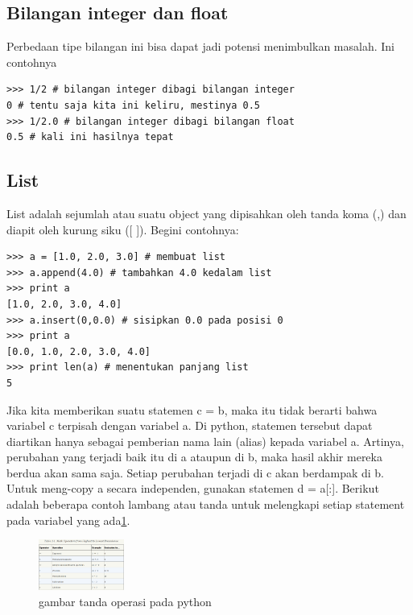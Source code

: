 \subsection{Bilangan integer dan float}
Perbedaan tipe bilangan ini bisa dapat jadi potensi menimbulkan masalah. 
Ini contohnya
\begin{verbatim}
>>> 1/2 # bilangan integer dibagi bilangan integer
0 # tentu saja kita ini keliru, mestinya 0.5
>>> 1/2.0 # bilangan integer dibagi bilangan float
0.5 # kali ini hasilnya tepat
\end{verbatim}

\subsection{List}
List adalah sejumlah atau suatu object yang dipisahkan oleh tanda koma (,) dan diapit oleh kurung siku
([ ]). Begini contohnya:
\begin{verbatim}
>>> a = [1.0, 2.0, 3.0] # membuat list
>>> a.append(4.0) # tambahkan 4.0 kedalam list
>>> print a
[1.0, 2.0, 3.0, 4.0]
>>> a.insert(0,0.0) # sisipkan 0.0 pada posisi 0
>>> print a
[0.0, 1.0, 2.0, 3.0, 4.0]
>>> print len(a) # menentukan panjang list
5
\end{verbatim}
Jika kita memberikan suatu statemen c = b, maka itu tidak berarti bahwa variabel c terpisah dengan
variabel a. Di python, statemen tersebut dapat diartikan hanya sebagai pemberian nama lain
(alias) kepada variabel a. Artinya, perubahan yang terjadi baik itu di a ataupun di b, maka hasil
akhir mereka berdua akan sama saja. Setiap perubahan terjadi di c akan berdampak di b.
Untuk meng-copy a secara independen, gunakan statemen d = a[:]. 
Berikut adalah beberapa contoh lambang atau tanda untuk melengkapi setiap statement pada
variabel yang ada\ref{operate}.
\begin{figure}[ht]
    \centerline{\includegraphics[width=0.25\textwidth]{figures/operate.png}}
    \caption{gambar tanda operasi pada python}
    \label{operate}
    \end{figure}

